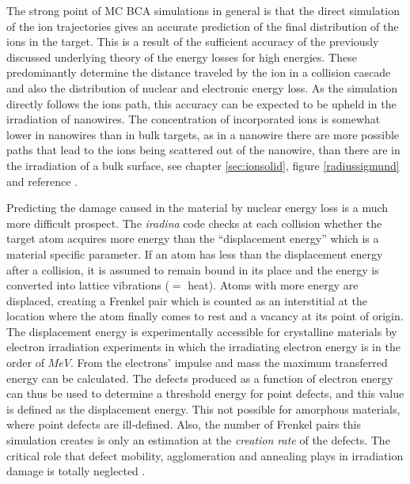 The strong point of MC BCA simulations in general is that the direct simulation of the ion trajectories gives an accurate prediction of the final distribution of the ions in the target. This is a result of the sufficient accuracy of the previously discussed underlying theory of the energy losses for high energies. These predominantly determine the distance traveled by the ion in a collision cascade and also the distribution of nuclear and electronic energy loss. As the simulation directly follows the ions path, this accuracy can be expected to be upheld in the irradiation of nanowires. The concentration of incorporated ions is somewhat lower in nanowires than in bulk targets, as in a nanowire there are more possible paths that lead to the ions being scattered out of the nanowire, than there are in the irradiation of a bulk surface, see chapter \ref{sec:ionsolid}, figure \ref{radiussigmund} and reference \cite{borschel_ion-solid_2012}. 

Predicting the damage caused in the material by nuclear energy loss is a much more difficult prospect. The \emph{iradina} code checks at each collision whether the target atom acquires more energy than the ``displacement energy'' which is a material specific parameter. If an atom has less than the displacement energy after a collision, it is assumed to remain bound in its place and the energy is converted into lattice vibrations ($=$ heat). Atoms with more energy are displaced, creating a Frenkel pair which is counted as an interstitial at the location where the atom finally comes to rest and a vacancy at its point of origin. The displacement energy is experimentally accessible for crystalline materials by electron irradiation experiments in which the irradiating electron energy is in the order of $MeV$. From the electrons' impulse and mass the maximum transferred energy can be calculated. The defects produced as a function of electron energy can thus be used to determine a threshold energy for point defects, and this value is defined as the displacement energy. This not possible for amorphous materials, where point defects are ill-defined. Also, the number of Frenkel pairs this simulation creates is only an estimation at the \emph{creation rate} of the defects. The critical role that defect mobility, agglomeration and annealing plays in irradiation damage is totally neglected \cite{nordlund_correction_2014}.

